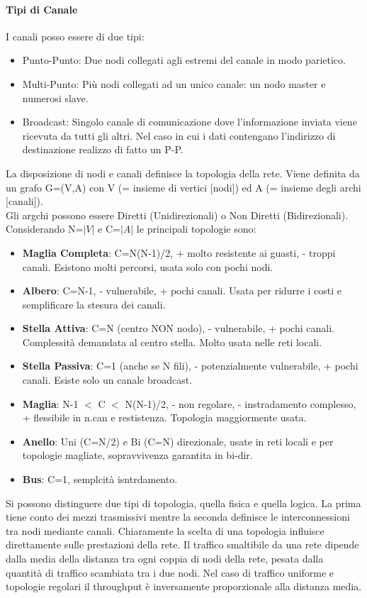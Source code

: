 \documentclass[12pt]{article}
\begin{document}
\paragraph{Tipi di Canale} I canali posso essere di due tipi:
\begin{itemize}
  \item Punto-Punto: Due nodi collegati agli estremi del canale in modo parietico.
  \item Multi-Punto: Più nodi collegati ad un unico canale: un nodo master e numerosi slave.
  \item Broadcast: Singolo canale di comunicazione dove l'informazione inviata viene ricevuta da tutti gli altri. Nel caso in cui i dati contengano l'indirizzo di destinazione realizzo di fatto un P-P.
\end{itemize}
La disposizione di nodi e canali definisce la topologia della rete. Viene definita da un grafo G=(V,A) con V (= insieme di vertici [nodi]) ed A (= insieme degli archi [canali]).\\
Gli argchi possono essere Diretti (Unidirezionali) o Non Diretti (Bidirezionali).\\
Considerando N=$|V|$ e C=$|A|$ le principali topologie sono:
\begin{itemize}
  \item \textbf{Maglia Completa}: C=N(N-1)/2, + molto resistente ai guasti, - troppi canali. Esistono molti percorsi, usata solo con pochi nodi.
  \item \textbf{Albero}: C=N-1, - vulnerabile, + pochi canali. Usata per ridurre i costi e semplificare la stesura dei canali.
  \item \textbf{Stella Attiva}: C=N (centro NON nodo), - vulnerabile, + pochi canali. Complessità demandata al centro stella. Molto usata nelle reti locali.
  \item \textbf{Stella Passiva}: C=1 (anche se N fili), - potenzialmente vulnerabile, + pochi canali. Esiste solo un canale broadcast.
  \item \textbf{Maglia}: N-1 $<$ C $<$ N(N-1)/2, - non regolare, - instradamento complesso, + flessibile in n.can e restistenza. Topologia maggiormente usata.
  \item \textbf{Anello}: Uni (C=N/2) e Bi (C=N) direzionale, usate in reti locali e per topologie magliate, sopravvivenza garantita in bi-dir.
  \item \textbf{Bus}: C=1, semplcità isntrdamento.
\end{itemize}
Si possono distinguere due tipi di topologia, quella fisica e quella logica. La prima tiene conto dei mezzi trasmissivi mentre la seconda definisce le interconnessioni tra nodi mediante canali. Chiaramente la scelta di una topologia influisce direttamente sulle prestazioni della rete. Il traffico smaltibile da una rete dipende dalla media della distanza tra ogni coppia di nodi della rete, pesata dalla quantità di traffico scambiata tra i due nodi. Nel caso di traffico uniforme e topologie regolari il throughput è inversamente proporzionale alla distanza media.
\end{document}
